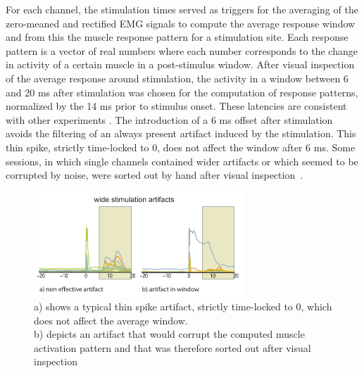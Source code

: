 For each channel, the stimulation times served as triggers for the averaging of the zero-meaned and rectified EMG signals to compute the average response window and from this the muscle response pattern for a stimulation site. Each response pattern is a vector of real numbers where each number corresponds to the change in activity of a certain muscle in a post-stimulus window. After visual inspection of the average response around stimulation, the activity in a window between 6 and 20 ms after stimulation was chosen for the computation of response patterns, normalized by the 14 ms prior to stimulus onset. These latencies are consistent with other experiments \citep{Park:2004p3042}. The introduction of a 6 ms offset after stimulation avoids the filtering of an always present artifact induced by the stimulation. This thin spike, strictly time-locked to 0, does not affect the window after 6 ms. Some sessions, in which single channels contained wider artifacts or which seemed to be corrupted by noise, were sorted out by hand after visual inspection~.
\begin{figure}[ht]
	\centering
		\includegraphics[width=0.7\textwidth]{images/artifacts.pdf}
	\caption{a) shows a typical thin spike artifact, strictly time-locked to 0, which does not affect the average window. \\
	b) depicts an artifact that would corrupt the computed muscle activation pattern and that was therefore sorted out
	after visual inspection}
	\label{sg:fig:images_artifacts}
\end{figure}



